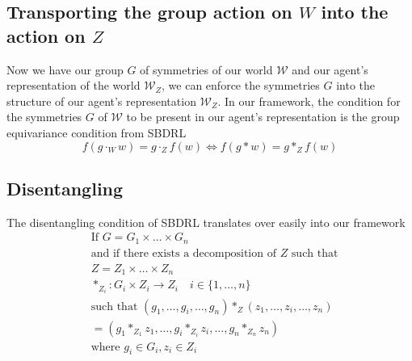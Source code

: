 \subsection{Transporting the group action on $W$ into the action on $Z$}

Now we have our group $G$ of symmetries of our world $\mathscr{W}$ and our agent's representation of the world $\mathscr{W}_{Z}$, we can enforce the symmetries $G$ into the structure of our agent's representation $\mathscr{W}_{Z}$.
In our framework, the condition for the symmetries $G$ of $\mathscr{W}$ to be present in our agent's representation is the group equivariance condition from SBDRL
\begin{equation}
    f(g \cdot_{W} w) = g \cdot_{Z} f(w) \iff f(g \ast w) = g \ast_{Z} f(w)
\end{equation}

\subsection{Disentangling}
The disentangling condition of SBDRL translates over easily into our framework
\begin{align}
    &\text{If } G = G_{1} \times \dots \times G_{n} \\
    &\text{and if there exists a decomposition of $Z$ such that} \\
    &Z = Z_{1} \times \dots \times Z_{n} \\
    &*_{Z_{i}}: G_{i} \times Z_{i} \to Z_{i} \quad i \in \{1, \dots, n\} \\
    &\text{such that } (g_{1}, \dots, g_{i}, \dots, g_{n}) \ast_{Z} (z_{1}, \dots, z_{i}, \dots, z_{n}) \\
    &= (g_{1} \ast_{Z_{1}} z_{1}, \dots, g_{i} \ast_{Z_{i}} z_{i}, \dots, g_{n} \ast_{Z_{n}} z_{n} ) \\
    & \text{where } g_{i} \in G_{i}, z_{i} \in Z_{i}
\end{align}

